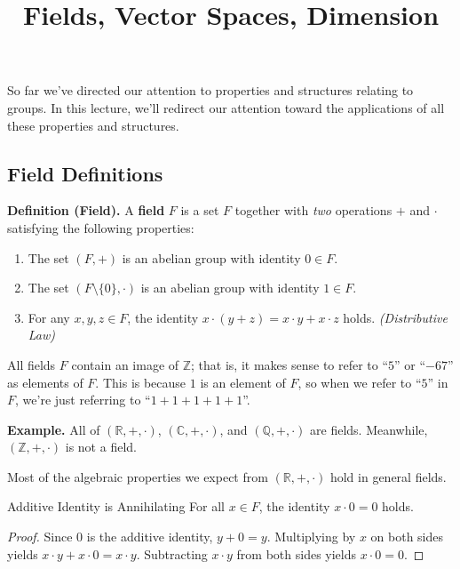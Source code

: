 \title{Fields, Vector Spaces, Dimension}



So far we've directed our attention to properties and structures relating to groups.  In this lecture, we'll redirect our attention toward the applications of all these properties and structures.

\subsection{Field Definitions}

\textbf{Definition (Field).} A \textbf{field} $F$ is a set $F$ together with \emph{two} operations $+$ and $\cdot$ satisfying the following properties:
\begin{enumerate}
    \item The set $(F, +)$ is an abelian group with identity $0 \in F$.
    \item The set $(F \setminus \{0\}, \cdot)$ is an abelian group with identity $1 \in F$.
    \item For any $x, y, z \in F$, the identity $x \cdot (y + z) = x \cdot y + x \cdot z$ holds. \emph{(Distributive Law)}
\end{enumerate}

\begin{remark}
    All fields $F$ contain an image of $\mathbb{Z}$; that is, it makes sense to refer to ``$5$'' or ``$-67$'' as elements of $F$.  This is because $1$ is an element of $F$, so when we refer to ``$5$'' in $F$, we're just referring to ``$1 + 1 + 1 + 1 + 1$''.
\end{remark}

\textbf{Example.} All of $(\mathbb{R}, +, \cdot)$, $(\mathbb{C}, +, \cdot)$, and $(\mathbb{Q}, +, \cdot)$ are fields.  Meanwhile, $(\mathbb{Z}, +, \cdot)$ is not a field.

Most of the algebraic properties we expect from $(\mathbb{R}, +, \cdot)$ hold in general fields.

\begin{theorem}{Additive Identity is Annihilating}
    For all $x \in F$, the identity $x \cdot 0 = 0$ holds.
\end{theorem}

\begin{proof}
    Since $0$ is the additive identity, $y + 0 = y$.  Multiplying by $x$ on both sides yields $x \cdot y + x \cdot 0 = x \cdot y$.  Subtracting $x \cdot y$ from both sides yields $x \cdot 0 = 0$.
\end{proof}

